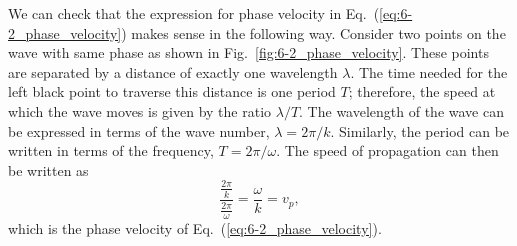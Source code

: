 We can check that the expression for phase velocity in Eq.~(\ref{eq:6-2_phase_velocity}) makes sense in the following way.
Consider two points on the wave with same phase as shown in Fig.~\ref{fig:6-2_phase_velocity}.
These points are separated by a distance of exactly one wavelength $\lambda$.
The time needed for the left black point to traverse this distance is one period $T$;
therefore, the speed at which the wave moves is given by the ratio $\lambda / T$.
The wavelength of the wave can be expressed in terms of the wave number, $\lambda = 2\pi / k$.
Similarly, the period can be written in terms of the frequency, $T = 2\pi / \omega$.
The speed of propagation can then be written as
\begin{equation}
    \frac{\frac{2\pi}{k}}{\frac{2\pi}{\omega}} = \frac{\omega}{k} = v_p,
\end{equation}
which is the phase velocity of Eq.~(\ref{eq:6-2_phase_velocity}).


